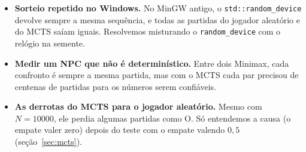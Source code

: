 \documentclass[11pt,a4paper]{article}
\begin{document}
\begin{itemize}
  \item \textbf{Sorteio repetido no Windows.} No MinGW antigo, o
    \texttt{std::random\_device} devolve sempre a mesma sequência, e todas as
    partidas do jogador aleatório e do MCTS saíam iguais. Resolvemos misturando
    o \texttt{random\_device} com o relógio na semente.
  \item \textbf{Medir um NPC que não é determinístico.} Entre dois Minimax,
    cada confronto é sempre a mesma partida, mas com o MCTS cada par precisou
    de centenas de partidas para os números serem confiáveis.
  \item \textbf{As derrotas do MCTS para o jogador aleatório.} Mesmo com
    $N = 10000$, ele perdia algumas partidas como O. Só entendemos a causa (o
    empate valer zero) depois do teste com o empate valendo $0{,}5$
    (seção~\ref{sec:mcts}).
\end{itemize}
\end{document}
